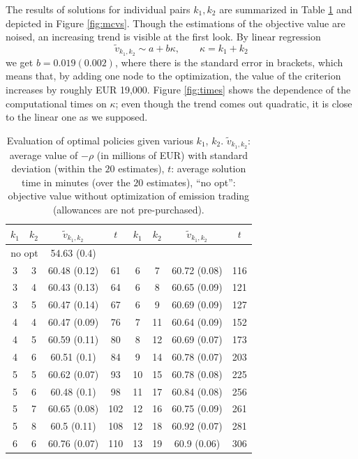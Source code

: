 \documentclass{article}              %
\begin{document}
The results of solutions for individual pairs $k_1,k_2$ are summarized in Table
\ref{tab:res} and depicted in Figure \ref{fig:mcvs}. Though
the estimations of the objective value are noised, an increasing trend is visible
at the first look. By linear regression
\[
\tilde{v}_{k_1,k_2}\sim a+b\kappa,\qquad \kappa=k_{1}+k_{2}
\]
we get $b=0.019(0.002)$, where there is the standard error in brackets, which means that, by adding one node to the
optimization, the value of the criterion increases by roughly EUR 19,000.
Figure \ref{fig:times} shows the dependence of the computational
times on $\kappa$; even though the trend comes out quadratic, it is
close to the linear one as we supposed.
\begin{table}
\begin{center}
\begin{tabular}{cccc|cccc}
$k_1$ & $k_2$ & $\tilde v_{k_1,k_2}$ & $t$ & $k_1$ & $k_2$ & $\tilde v_{k_1,k_2}$ & $t$ \\
\hline
	\multicolumn{2}{c}{no opt}		&	54.63	(0.4)	&		\\
\hline
3	&	3	&	60.48	(0.12)	&	61	&	6	&	7	&	60.72	(0.08)	&	116	\\
3	&	4	&	60.43	(0.13)	&	64	&	6	&	8	&	60.65	(0.09)	&	121	\\
3	&	5	&	60.47	(0.14)	&	67	&	6	&	9	&	60.69	(0.09)	&	127	\\
4	&	4	&	60.47	(0.09)	&	76	&	7	&	11	&	60.64	(0.09)	&	152	\\
4	&	5	&	60.59	(0.11)	&	80	&	8	&	12	&	60.69	(0.07)	&	173	\\
4	&	6	&	60.51	(0.1)	&	84	&	9	&	14	&	60.78	(0.07)	&	203	\\
5	&	5	&	60.62	(0.07)	&	93	&	10	&	15	&	60.78	(0.08)	&	225	\\
5	&	6	&	60.48	(0.1)	&	98	&	11	&	17	&	60.84	(0.08)	&	256	\\
5	&	7	&	60.65	(0.08)	&	102	&	12	&	16	&	60.75	(0.09)	&	261	\\
5	&	8	&	60.5	(0.11)	&	108	&	12	&	18	&	60.92	(0.07)	&	281	\\
6	&	6	&	60.76	(0.07)	&	110	&	13	&	19	&	60.9	(0.06)	&	306	\\

\hline
\end{tabular}
\caption{Evaluation of optimal policies given various $k_1$, $k_2$. $\tilde v_{k_{1},k_{2}}$: average value of $-\rho$ (in
millions of EUR) with standard deviation (within the $20$ estimates),
$t$: average solution time in minutes (over the $20$ estimates), ``no opt'': objective value without
optimization of emission trading (allowances are not pre-purchased).
}
\label{tab:res}
\end{center}
\end{table}
\end{document}
